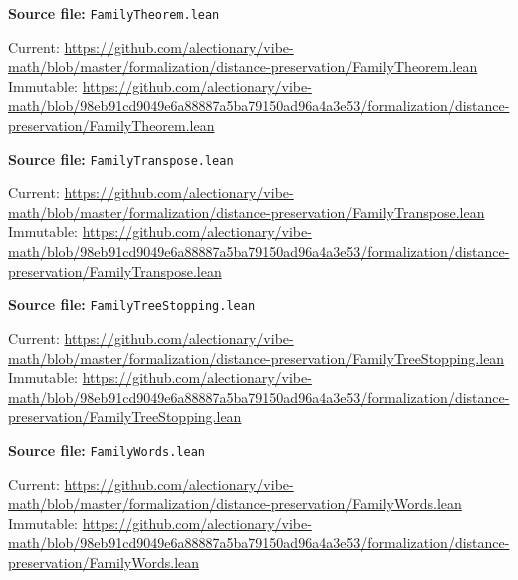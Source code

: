 \par\smallskip\noindent\begin{minipage}{\linewidth}\small\setlength{\baselineskip}{11pt}
\textbf{Source file:} \nolinkurl{FamilyTheorem.lean}\par\nopagebreak
Current: \url{https://github.com/alectionary/vibe-math/blob/master/formalization/distance-preservation/FamilyTheorem.lean}\\
Immutable: \url{https://github.com/alectionary/vibe-math/blob/98eb91cd9049e6a88887a5ba79150ad96a4a3e53/formalization/distance-preservation/FamilyTheorem.lean}\par\end{minipage}\par
\par\smallskip\noindent\begin{minipage}{\linewidth}\small\setlength{\baselineskip}{11pt}
\textbf{Source file:} \nolinkurl{FamilyTranspose.lean}\par\nopagebreak
Current: \url{https://github.com/alectionary/vibe-math/blob/master/formalization/distance-preservation/FamilyTranspose.lean}\\
Immutable: \url{https://github.com/alectionary/vibe-math/blob/98eb91cd9049e6a88887a5ba79150ad96a4a3e53/formalization/distance-preservation/FamilyTranspose.lean}\par\end{minipage}\par
\par\smallskip\noindent\begin{minipage}{\linewidth}\small\setlength{\baselineskip}{11pt}
\textbf{Source file:} \nolinkurl{FamilyTreeStopping.lean}\par\nopagebreak
Current: \url{https://github.com/alectionary/vibe-math/blob/master/formalization/distance-preservation/FamilyTreeStopping.lean}\\
Immutable: \url{https://github.com/alectionary/vibe-math/blob/98eb91cd9049e6a88887a5ba79150ad96a4a3e53/formalization/distance-preservation/FamilyTreeStopping.lean}\par\end{minipage}\par
\par\smallskip\noindent\begin{minipage}{\linewidth}\small\setlength{\baselineskip}{11pt}
\textbf{Source file:} \nolinkurl{FamilyWords.lean}\par\nopagebreak
Current: \url{https://github.com/alectionary/vibe-math/blob/master/formalization/distance-preservation/FamilyWords.lean}\\
Immutable: \url{https://github.com/alectionary/vibe-math/blob/98eb91cd9049e6a88887a5ba79150ad96a4a3e53/formalization/distance-preservation/FamilyWords.lean}\par\end{minipage}\par
